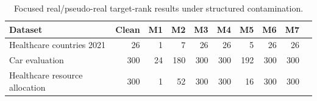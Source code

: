 \begin{table}[H]
\centering
\small
\caption{Focused real/pseudo-real target-rank results under structured contamination.}
\label{tab:focused-real}
\begin{tabular}{lrrrrrrrrr}
\toprule
Dataset & Clean & M1 & M2 & M3 & M4 & M5 & M6 & M7 \\
\midrule
Healthcare countries 2021 & 26 & 1 & 7 & 26 & 26 & 5 & 26 & 26 \\
Car evaluation & 300 & 24 & 180 & 300 & 300 & 192 & 300 & 300 \\
Healthcare resource allocation & 300 & 1 & 52 & 300 & 300 & 16 & 300 & 300 \\
\bottomrule
\end{tabular}
\end{table}
